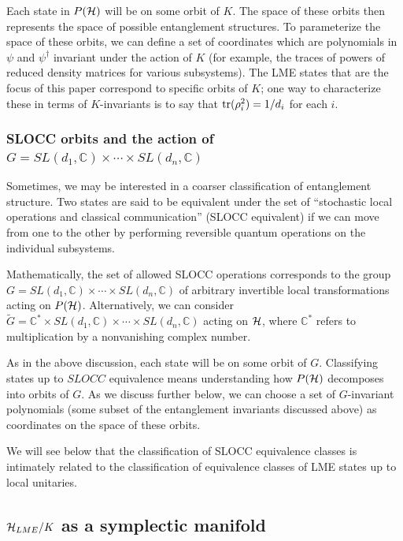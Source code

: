\documentclass[12pt]{article}
\theoremstyle{definition}
\newcommand{\tr}{{\rm tr}}
\begin{document}
Each state in $P({\cal H})$ will be on some orbit of $K$. The space of these orbits then represents the space of possible entanglement structures. To parameterize the space of these orbits, we can define a set of coordinates which are polynomials in $\psi$ and $\psi^\dagger$ invariant under the action of $K$ (for example, the traces of powers of reduced density matrices for various subsystems). The LME states that are the focus of this paper correspond to specific orbits of $K$; one way to characterize these in terms of $K$-invariants is to say that $\tr(\rho_i^2) = 1/d_i$ for each $i$.

\subsubsection{SLOCC orbits and the action of $G = SL(d_1,\mathbb{C}) \times \cdots \times SL(d_n,\mathbb{C})$}

Sometimes, we may be interested in a coarser classification of entanglement structure. Two states are said to be equivalent under the set of ``stochastic local operations and classical communication'' (SLOCC equivalent) if we can move from one to the other by performing reversible quantum operations on the individual subsystems.

Mathematically, the set of allowed SLOCC operations corresponds to the group $G = SL(d_1, \mathbb{C}) \times \cdots \times SL(d_n, \mathbb{C})$ of arbitrary invertible local transformations acting on $P({\cal H})$. Alternatively, we can consider $\tilde{G} = \mathbb{C}^* \times SL(d_1, \mathbb{C}) \times \cdots \times SL(d_n, \mathbb{C})$ acting on ${\cal H}$, where $\mathbb{C}^*$ refers to multiplication by a nonvanishing complex number.

As in the above discussion, each state will be on some orbit of $G$. Classifying states up to $SLOCC$ equivalence means understanding how $P({\cal H})$ decomposes into orbits of $G$. As we discuss further below, we can choose a set of $G$-invariant polynomials (some subset of the entanglement invariants discussed above) as coordinates on the space of these orbits.

We will see below that the classification of SLOCC equivalence classes is intimately related to the classification of equivalence classes of LME states up to local unitaries.

\subsection{${\cal H}_{LME}/K$ as a symplectic manifold}
\end{document}
